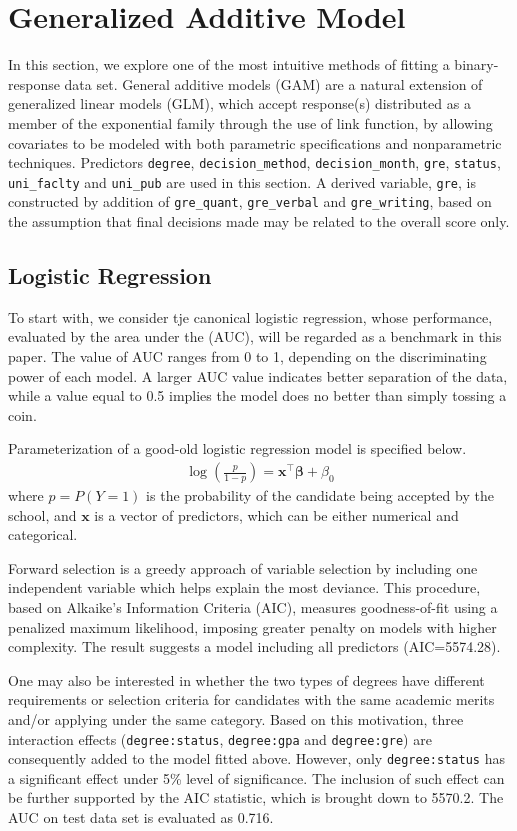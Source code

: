 \section{Generalized Additive Model} \label{sec:gam}
In this section, we explore one of the most intuitive methods of fitting a binary-response data set. General additive models (GAM) are a natural extension of generalized linear models (GLM), which accept response(s) distributed as a member of the exponential family through the use of link function, by allowing covariates to be modeled with both parametric specifications and nonparametric techniques. Predictors \texttt{degree}, \texttt{decision\_method}, \texttt{decision\_month}, \texttt{gre}, \texttt{status}, \texttt{uni\_faclty} and \texttt{uni\_pub} are used in this section. A derived variable, \texttt{gre}, is constructed by addition of \texttt{gre\_quant}, \texttt{gre\_verbal} and \texttt{gre\_writing}, based on the assumption that final decisions made may be related to the overall score only.
\subsection{Logistic Regression}
To start with, we consider tje canonical logistic regression, whose performance, evaluated by the area under the  (AUC), will be regarded as a benchmark in this paper. The value of AUC ranges from 0 to 1, depending on the discriminating power of each model. A larger AUC value indicates better separation of the data, while a value equal to 0.5 implies the model does no better than simply tossing a coin.
\par Parameterization of a good-old logistic regression model is specified below.
\begin{align}
\log\left(\frac{p}{1-p}\right)=\mathbf{x}^\top\boldsymbol{\beta}+\beta_0
\end{align}
where $p=P(Y=1)$ is the probability of the candidate being accepted by the school, and $\mathbf{x}$ is a vector of predictors, which can be either numerical and categorical. 
\par Forward selection is a greedy approach of variable selection by including one independent variable which helps explain the most deviance. This procedure, based on Alkaike's Information Criteria (AIC), measures goodness-of-fit using a penalized maximum likelihood, imposing greater penalty on models with higher complexity. The result suggests a model including all predictors (AIC=5574.28).
\par One may also be interested in whether the two types of degrees have different requirements or selection criteria for candidates with the same academic merits and/or applying under the same category. Based on this motivation, three interaction effects (\texttt{degree:status}, \texttt{degree:gpa} and \texttt{degree:gre}) are consequently added to the model fitted above. However, only \texttt{degree:status} has a significant effect under 5\% level of significance. The inclusion of such effect can be further supported by the AIC statistic, which is brought down to 5570.2. The AUC on test data set is evaluated as 0.716.

